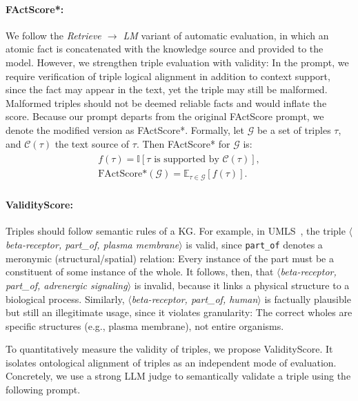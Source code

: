 \documentclass[10pt]{article}
\begin{document}
\paragraph{FActScore*:} 
We follow the \emph{Retrieve $\rightarrow$ LM} variant of automatic evaluation, in which an atomic fact is concatenated with the knowledge source and provided to the model. However, we strengthen triple evaluation with validity: In the prompt, we require verification of triple logical alignment in addition to context support, since the fact may appear in the text, yet the triple may still be malformed. Malformed triples should not be deemed reliable facts and would inflate the score. Because our prompt departs from the original FActScore prompt, we denote the modified version as FActScore*. 
Formally, let $\mathcal{G}$ be a set of triples $\tau$, and $\mathcal{C}(\tau)$ the text source of $\tau$. Then FActScore* for $\mathcal{G}$ is:
\begin{align}
    \begin{gathered}
        f(\tau) = \mathbb{I}[\tau \text{~is supported by~} \mathcal{C}(\tau)], \\
        \text{FActScore*}(\mathcal{G}) =
        \mathbb{E}_{\tau \in \mathcal{G}}[f(\tau)].
    \end{gathered}
    \label{eq:factscore}
\end{align}

\paragraph{ValidityScore:}
Triples should follow semantic rules of a KG. For example, in UMLS~\cite{UMLS}, the triple \textit{$\langle$beta-receptor, part\_of, plasma membrane$\rangle$} is valid, since \texttt{part\_of} denotes a meronymic (structural/spatial) relation: Every instance of the part must be a constituent of some instance of the whole. It follows, then, that \textit{$\langle$beta-receptor, part\_of, adrenergic signaling$\rangle$} is invalid, because it links a physical structure to a biological process. Similarly, \textit{$\langle$beta-receptor, part\_of, human$\rangle$} is factually plausible but still an illegitimate usage, since it violates granularity: The correct wholes are specific structures (e.g., plasma membrane), not entire organisms. 

To quantitatively measure the validity of triples, we propose ValidityScore. It isolates ontological alignment of triples as an independent mode of evaluation. Concretely, we use a strong LLM judge to semantically validate a triple using the following prompt.
\end{document}
